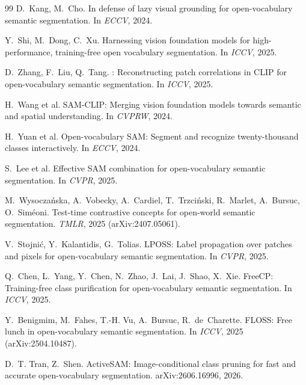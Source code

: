 \documentclass[11pt]{article}
\begin{document}
\begin{thebibliography}{99}
D.~Kang, M.~Cho.
\newblock In defense of lazy visual grounding for open-vocabulary semantic
  segmentation.
\newblock In \emph{ECCV}, 2024.

Y.~Shi, M.~Dong, C.~Xu.
\newblock Harnessing vision foundation models for high-performance, training-free
  open vocabulary segmentation.
\newblock In \emph{ICCV}, 2025.

D.~Zhang, F.~Liu, Q.~Tang.
: Reconstructing patch correlations in {CLIP} for
  open-vocabulary semantic segmentation.
\newblock In \emph{ICCV}, 2025.

H.~Wang et al.
\newblock SAM-CLIP: Merging vision foundation models towards semantic and spatial
  understanding.
\newblock In \emph{CVPRW}, 2024.

H.~Yuan et al.
\newblock Open-vocabulary SAM: Segment and recognize twenty-thousand classes
  interactively.
\newblock In \emph{ECCV}, 2024.

S.~Lee et al.
\newblock Effective SAM combination for open-vocabulary semantic segmentation.
\newblock In \emph{CVPR}, 2025.

M.~Wysocza\'nska, A.~Vobecky, A.~Cardiel, T.~Trzci\'nski, R.~Marlet,
A.~Bursuc, O.~Sim\'eoni.
\newblock Test-time contrastive concepts for open-world semantic segmentation.
\newblock \emph{TMLR}, 2025 (arXiv:2407.05061).

V.~Stojni\'c, Y.~Kalantidis, G.~Tolias.
\newblock LPOSS: Label propagation over patches and pixels for open-vocabulary
  semantic segmentation.
\newblock In \emph{CVPR}, 2025.

Q.~Chen, L.~Yang, Y.~Chen, N.~Zhao, J.~Lai, J.~Shao, X.~Xie.
\newblock FreeCP: Training-free class purification for open-vocabulary
  semantic segmentation.
\newblock In \emph{ICCV}, 2025.

Y.~Benigmim, M.~Fahes, T.-H. Vu, A.~Bursuc, R.~de~Charette.
\newblock FLOSS: Free lunch in open-vocabulary semantic segmentation.
\newblock In \emph{ICCV}, 2025 (arXiv:2504.10487).

D.~T. Tran, Z.~Shen.
\newblock ActiveSAM: Image-conditional class pruning for fast and accurate
  open-vocabulary segmentation.
\newblock arXiv:2606.16996, 2026.


\end{thebibliography}
\end{document}

